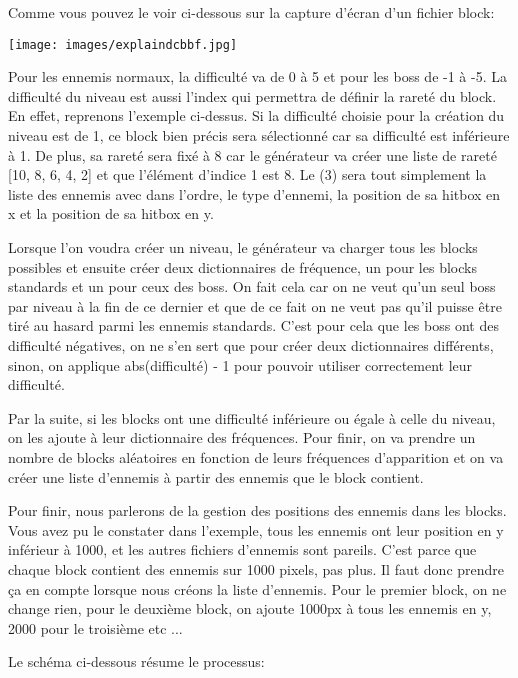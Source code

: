 \documentclass{article}
\begin{document}
Comme vous pouvez le voir ci-dessous sur la capture d'écran d'un fichier block:

\begin{center}
\texttt{[image: images/explaindcbbf.jpg]}
\end{center}

Pour les ennemis normaux, la difficulté va de 0 à 5 et pour les boss de -1 à -5.
La difficulté du niveau est aussi l'index qui permettra de définir la rareté du
block. En effet, reprenons l'exemple ci-dessus. Si la difficulté choisie pour la
création du niveau est de 1, ce block bien précis sera sélectionné car sa
difficulté est inférieure à 1. De plus, sa rareté sera fixé à 8 car le
générateur va créer une liste de rareté [10, 8, 6, 4, 2] et que l'élément
d'indice 1 est 8. Le (3) sera tout simplement la liste des ennemis avec dans
l'ordre, le type d'ennemi, la position de sa hitbox en x et la position de sa
hitbox en y.

Lorsque l'on voudra créer un niveau, le générateur va charger tous les blocks
possibles et ensuite créer deux dictionnaires de fréquence, un pour les blocks
standards et un pour ceux des boss. On fait cela car on ne veut qu'un seul boss
par niveau à la fin de ce dernier et que de ce fait on ne veut pas qu'il puisse
être tiré au hasard parmi les ennemis standards. C'est pour cela que les boss
ont des difficulté négatives, on ne s'en sert que pour créer deux dictionnaires
différents, sinon, on applique abs(difficulté) - 1 pour pouvoir utiliser
correctement leur difficulté.

Par la suite, si les blocks ont une difficulté inférieure ou égale à celle du
niveau, on les ajoute à leur dictionnaire des fréquences. Pour finir, on va
prendre un nombre de blocks aléatoires en fonction de leurs fréquences
d'apparition et on va créer une liste d'ennemis à partir des ennemis que le
block contient.

Pour finir, nous parlerons de la gestion des positions des ennemis dans les
blocks. Vous avez pu le constater dans l'exemple, tous les ennemis ont leur
position en y inférieur à 1000, et les autres fichiers d'ennemis sont pareils.
C'est parce que chaque block contient des ennemis sur 1000 pixels, pas plus. Il
faut donc prendre ça en compte lorsque nous créons la liste d'ennemis. Pour le
premier block, on ne change rien, pour le deuxième block, on ajoute 1000px à
tous les ennemis en y, 2000 pour le troisième etc ...

Le schéma ci-dessous résume le processus:
\end{document}
